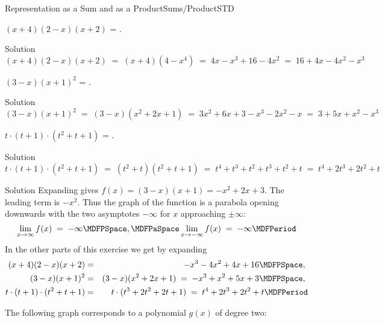 \begin{MXContent}{Representation as a Sum and as a Product}{Sums/Product}{STD}
\begin{MExercise}
\begin{MExerciseItems}
{
}
\item{$(x+4)(2-x)(x+2)$ = . \begin{MHint}{Solution}$$(x+4)(2-x)(x+2) \; = \; (x+4)(4-x^4) \;=\; 4x-x^3+16-4x^2 \;=\; 16 + 4x - 4x^2 -x^3 $$\end{MHint}}
\item{$(3-x)(x+1)^2$ = . \begin{MHint}{Solution}$$(3-x)(x+1)^2 \; = \; (3-x)(x^2+2x+1) \;=\; 3x^2+6x+3-x^3-2x^2-x \;=\; 3 + 5x + x^2 -x^3 $$\end{MHint}}
\item{$t\cdot (t+1)\cdot (t^2+t+1)$ = . \begin{MHint}{Solution}$$t\cdot (t+1)\cdot (t^2+t+1) \; = \; (t^2+t)(t^2+t+1) \;=\; t^4+t^3+t^2+t^3+t^2+t \;=\; t^4+2t^3+2t^2+t $$\end{MHint}}
\end{MExerciseItems}

\begin{MHint}{Solution}
Expanding gives $f(x)=(3-x)(x+1) =-x^2+2x+3$. The leading term is $-x^2$. Thus the graph of the function is a 
parabola opening downwards with the two asymptotes $-\infty$ for $x$ approaching $\pm\infty$:
$$
\lim_{x\rightarrow \infty} f(x) \;=\; -\infty \MDFPSpace, \MDFPaSpace \lim_{x\rightarrow -\infty} f(x) \;=\; -\infty\MDFPeriod 
$$
In the other parts of this exercise we get by expanding
\begin{eqnarray*}
(x+4)(2-x)(x+2) &=& -x^3-4x^2+4x+16 \MDFPSpace,\ \\
(3-x)(x+1)^2 &=& (3-x)(x^2+2x+1) \;=\; -x^3+x^2+5x+3 \MDFPSpace, \ \\
t\cdot (t+1)\cdot (t^2+t+1) & = & t\cdot(t^3+2t^2+2t+1) \;=\; t^4+2t^3+2t^2+t \MDFPeriod
\end{eqnarray*}
\end{MHint}
\end{MExercise}

\begin{MExercise}
The following graph corresponds to a polynomial $g(x)$ of degree two:


\end{MExercise}
\end{MXContent}

